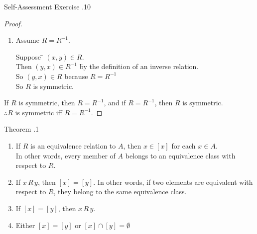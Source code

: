 \documentclass[../notes.tex]{subfiles}
\begin{document}
\begin{exercise}{Self-Assessment Exercise \thechapter.10}
\begin{enumerate}
\begin{proof}
\begin{enumerate}[label=(\roman*)]
									\item {}
										\begin{subproof}
											Assume $R = R^{-1}$.
											\begin{tabbing}
												Suppose \quad \= $(x, y) \in R$.\\
												Then \>$(y, x) \in R^{-1}$ \quad \= by the definition of an inverse relation.\\
												So \>$(y, x) \in R$ \> because $R = R^{-1}$\\
												So \> $R$ is symmetric.
											\end{tabbing}
										\end{subproof}
								\end{enumerate}
								If $R$ is symmetric, then $R = R^{-1}$, and if $R = R^{-1}$, then $R$ is symmetric.\\
								$\therefore R$ is symmetric iff $R = R^{-1}$.
							\end{proof}
					\end{enumerate}
				\end{exercise}
				\pagebreak
				\begin{theorem}{Theorem \thechapter.1}
					\begin{enumerate}[label=(\roman*)]
						\item If $R$ is an equivalence relation to $A$, then $x \in [x]$ for each $x \in A$.\\
							In other words, every member of $A$ belongs to an equivalence class with respect to $R$.
						\item If $x\, R \, y$, then $[x] = [y]$. In other words, if two elements are equivalent with respect to $R$, they belong to the same equivalence class.
						\item If $[x] = [y]$, then $x \, R \, y$.
						\item Either $[x] = [y]$ or $[x] \cap [y] = \emptyset$
					\end{enumerate}
				\end{theorem}
\end{document}
